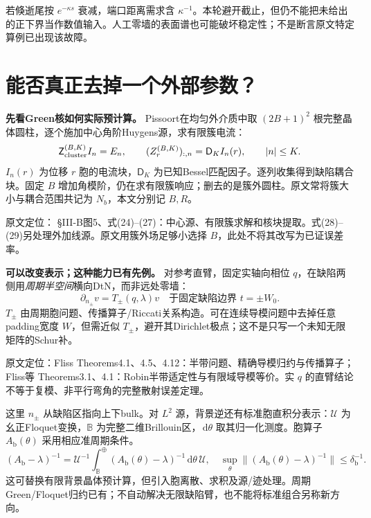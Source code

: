 \documentclass[UTF8,fontset=none,11pt,a4paper]{ctexart}
\newcommand{\dd}{\,\mathrm d}\newcommand{\spec}{\operatorname{spec}}
\newcommand{\bulk}{\mathrm{b}}
\newcommand{\source}[1]{{\small\raggedright\color{teal}原文定位：#1\par}}
\newcommand{\nextpage}{\clearpage}
\begin{document}
若倏逝尾按 $e^{-\kappa s}$ 衰减，端口距离需求含 $\kappa^{-1}$。本轮避开截止，但仍不能把未给出的正下界当作数值输入。人工零墙的表面谱也可能破坏稳定性\cite{fliss2015}；不是断言原文特定算例已出现该故障。

\nextpage
\section{能否真正去掉一个外部参数？}
\textbf{先看Green核如何实际预计算。} Pissoort在均匀外介质中取 $(2B+1)^2$ 根完整晶体圆柱，逐个施加中心角阶Huygens源，求有限簇电流：
\begin{equation}
 \mathsf Z_{\rm cluster}^{(B,K)}I_n=E_n,\qquad
 (Z_r^{(B,K)})_{:,n}=\mathsf D_K I_n(r),\qquad |n|\le K .
\end{equation}
$I_n(r)$ 为位移 $r$ 胞的电流块，$\mathsf D_K$ 为已知Bessel匹配因子。逐列收集得到缺陷耦合块。固定 $B$ 增加角模阶，仍在求有限簇响应；删去的是簇外圆柱。原文常将簇大小与耦合范围共记为 $N_b$，本文分别记 $B,R$。
\source{\cite{pissoort2005} §III-B图5、式(24)--(27)：中心源、有限簇求解和核块提取。式(28)--(29)另处理外加线源。原文用簇外场足够小选择 $B$，此处不将其改写为已证误差率。}

\textbf{可以改变表示；这种能力已有先例。} 对参考直臂，固定实轴向相位 $q$，在缺陷两侧用\emph{周期半空间}横向DtN，而非远处零墙：
\begin{equation}
 \partial_{n_\pm}v=T_\pm(q,\lambda)v
 \quad\text{于固定缺陷边界 }t=\pm W_0.
\end{equation}
$T_\pm$ 由周期胞问题、传播算子/Riccati关系构造。可在连续导模问题中去掉任意padding宽度 $W$，但需近似 $T_\pm$，避开其Dirichlet极点；这不是只写一个未知无限矩阵的Schur补。
\source{Fliss\cite{fliss2013} Theorems4.1、4.5、4.12：半带问题、精确导模归约与传播算子；Fliss等\cite{fliss2015} Theorems3.1、4.1：Robin半带适定性与有限域导模等价。实 $q$ 的直臂结论不等于复模、非平行弯角的完整散射误差定理。}

这里 $n_\pm$ 从缺陷区指向上下bulk。对 $L^2$ 源，背景逆还有标准胞直积分表示：$\mathcal U$ 为幺正Floquet变换，$\mathbb B$ 为完整二维Brillouin区，$\dd\theta$ 取其归一化测度。胞算子 $A_\bulk(\theta)$ 采用相应准周期条件。
\begin{equation}
 (A_\bulk-\lambda)^{-1}
 =\mathcal U^{-1}\!\int_{\mathbb B}^{\oplus}
 (A_\bulk(\theta)-\lambda)^{-1}\dd\theta\,\mathcal U,
 \quad\sup_\theta\|(A_\bulk(\theta)-\lambda)^{-1}\|\le\delta_\bulk^{-1}.
\end{equation}
这可替换有限背景晶体预计算，但引入胞离散、求积及源/迹处理。周期Green/Floquet归约已有\cite{coatleven2012}；不自动解决无限缺陷臂，也不能将标准组合另称新方向。
\end{document}
